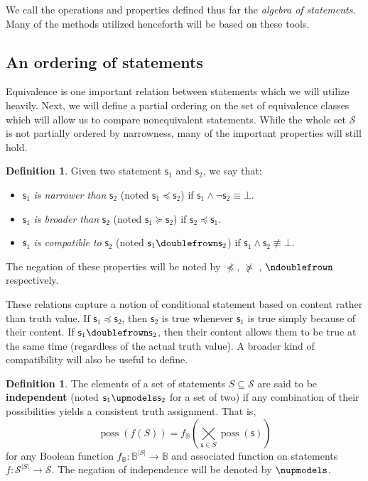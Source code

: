 \documentclass[psamsfonts]{amsart}
\theoremstyle{definition}
\newtheorem{defn}[thm]{Definition}
\theoremstyle{remark}
\numberwithin{equation}{section}
\DeclareMathOperator{\possFn}{poss}
\def\contradiction{\bot}
\def\comp{\doublefrown}
\def\ncomp{\ndoublefrown}
\def\narrower{\preccurlyeq}
\def\nnarrower{\npreccurlyeq}
\def\broader{\succcurlyeq}
\def\nbroader{\nsucccurlyeq}
\def\indep{\upmodels}
\def\nindep{\nupmodels}
\def\AND{\wedge}
\def\NOT{\neg}
\newcommand{\stmt}[1][s] {\mathsf{#1}}
\begin{document}
We call the operations and properties defined thus far the \emph{algebra of statements}. Many of the methods utilized henceforth will be based on these tools. 

\subsection{An ordering of statements}

Equivalence is one important relation between statements which we will utilize heavily. Next, we will define a partial ordering on the set of equivalence classes which will allow us to compare nonequivalent statements. While the whole set $\mathcal{S}$ is not partially ordered by narrowness, many of the important properties will still hold. 


\begin{defn}\label{def_statement_narrowness_and_compatibility}
	Given two statement $\stmt_1$ and $\stmt_2$, we say that:
	\begin{itemize}
		\item $\stmt_1$ \emph{is narrower than} $\stmt_2$ (noted $\stmt_1 \narrower \stmt_2$) if $\stmt_1 \AND \NOT \stmt_2 \equiv \contradiction$.
		\item $\stmt_1$ \emph{is broader than} $\stmt_2$ (noted $\stmt_1 \broader \stmt_2$) if $\stmt_2 \narrower \stmt_1$.
		\item $\stmt_1$ \emph{is compatible to} $\stmt_2$ (noted $\stmt_1 \comp \stmt_2$) if $\stmt_1 \AND \stmt_2 \nequiv \contradiction$.

	\end{itemize}
	The negation of these properties will be noted by $\nnarrower$, $\nbroader$ , $\ncomp$ respectively.
\end{defn}

These relations capture a notion of conditional statement based on content rather than truth value. If $\stmt_1\narrower\stmt_2$, then $\stmt_2$ is true whenever $\stmt_1$ is true simply because of their content. If $\stmt_1\comp\stmt_2$, then their content allows them to be true at the same time (regardless of the actual truth value). A broader kind of compatibility will also be useful to define. 

\begin{defn}\label{def_independent_statements}
	The elements of a set of statements $S \subseteq \mathcal{S}$ are said to be \textbf{independent} (noted $\stmt_1 \indep \stmt_2$ for a set of two) if any combination of their possibilities yields a consistent truth assignment. That is, $$\possFn(f(S)) = f_{\mathbb{B}}(\bigtimes\limits_{\stmt \in S} \possFn(\stmt))$$ for any Boolean function $f_{\mathbb{B}} : \mathbb{B}^{|S|} \to \mathbb{B}$ and associated function on statements $f:\mathcal{S}^{|S|}\to\mathcal{S}$. The negation of independence will be denoted by $\nindep$.
\end{defn}
\end{document}
